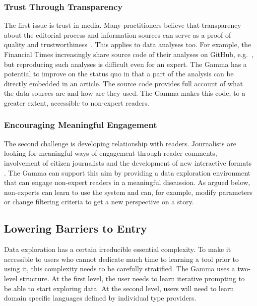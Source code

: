 \documentclass[manuscript,review,anonymous]{acmart}
\begin{document}
\subsubsection*{Trust Through Transparency}
The first issue is trust in media. Many practitioners believe that transparency
about the editorial process and information sources can serve as a proof of quality and
trustworthiness~\cite{transparency}. This applies to data analyses too. For example, the Financial Times
increasingly share source code of their analyses on GitHub, e.g.~\cite{ftnotebooks},
but reproducing such analyses is difficult even for an expert. The Gamma has a potential to
improve on the status quo in that a part of the analysis can be directly embedded in an article.
The source code provides full account of what the data sources are and how are they used.
The Gamma makes this code, to a greater extent, accessible to non-expert readers.

\subsubsection*{Encouraging Meaningful Engagement}

The second challenge is developing relationship with readers. Journalists are looking
for meaningful ways of engagement through reader comments, involvement of citizen journalists
\cite{comments,citizen} and the development of new interactive formats \cite{youdraw}.
The Gamma can support this aim by providing a data exploration environment that can engage
non-expert readers in a meaningful discussion. As argued below, non-experts can learn to use the
system and can, for example, modify parameters or change filtering criteria to get a
new perspective on a story.

\subsection{Lowering Barriers to Entry}
\label{sec:design-bar}

Data exploration has a certain irreducible essential complexity. To make it accessible to users who
cannot dedicate much time to learning a tool prior to using it, this complexity needs to be
carefully stratified. The Gamma uses a two-level structure. At the first level, the user needs
to learn iterative prompting to be able to start exploring data. At the second level, users will
need to learn domain specific languages defined by individual type providers.
\end{document}
